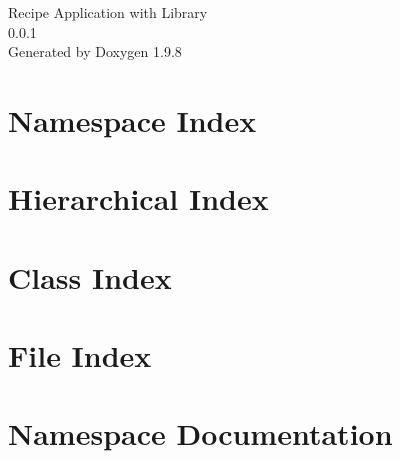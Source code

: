 \documentclass[twoside]{book}
\newcommand{\+}{\discretionary{\mbox{\scriptsize$\hookleftarrow$}}{}{}}
\newcommand{\clearemptydoublepage}{%
    \newpage{\pagestyle{empty}\cleardoublepage}%
  }
\begin{document}
  \raggedbottom
    \hypersetup{pageanchor=false,
                bookmarksnumbered=true,
                pdfencoding=unicode
               }
  \begin{titlepage}
  \vspace*{7cm}
  \begin{center}%
  {\Large Recipe Application with Library}\\
  [1ex]\large 0.\+0.\+1 \\
  \vspace*{1cm}
  {\large Generated by Doxygen 1.9.8}\\
  \end{center}
  \end{titlepage}
  \clearemptydoublepage
  \tableofcontents
  \clearemptydoublepage
  \hypersetup{pageanchor=true}
\chapter{Namespace Index}

\chapter{Hierarchical Index}

\chapter{Class Index}

\chapter{File Index}

\chapter{Namespace Documentation}

\end{document}
